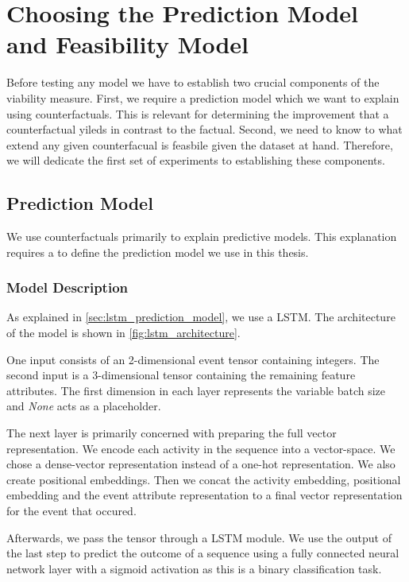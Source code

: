 \documentclass[./../../paper.tex]{subfiles}
\begin{document}
\section{Choosing the Prediction Model and Feasibility Model}
Before testing any model we have to establish two crucial components of the viability measure. First, we require a prediction model which we want to explain using counterfactuals. This is relevant for determining the improvement that a counterfactual yileds in contrast to the factual. Second, we need to know to what extend any given counterfacual is feasbile given the dataset at hand. Therefore, we will dedicate the first set of experiments to establishing these components.

\subsection{Prediction Model}
We use counterfactuals primarily to explain predictive models. This explanation requires a to define the prediction model we use in this thesis.

\subsubsection{Model Description}
As explained in \autoref{sec:lstm_prediction_model}, we use a \gls{LSTM}.
The architecture of the model is shown in \autoref{fig:lstm_architecture}.

One input consists of an 2-dimensional event tensor containing integers. The second input is a 3-dimensional tensor containing the remaining feature attributes. The first dimension in each layer represents the variable batch size and \emph{None} acts as a placeholder.

The next layer is primarily concerned with preparing the full vector representation. We encode each activity in the sequence into a vector-space. We chose a dense-vector representation instead of a one-hot representation. We also create positional embeddings. Then we concat the activity embedding, positional embedding and the event attribute representation to a final vector representation for the event that occured.

Afterwards, we pass the tensor through a \gls{LSTM} module. We use the output of the last step to predict the outcome of a sequence using a fully connected neural network layer with a sigmoid activation as this is a binary classification task.
\end{document}

